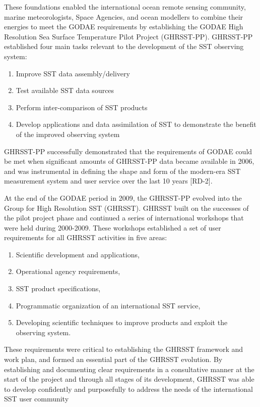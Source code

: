 These foundations enabled the international ocean remote sensing community, marine
meteorologists, Space Agencies, and ocean modellers to combine their energies to meet the GODAE
requirements by establishing the GODAE High Resolution Sea Surface Temperature Pilot Project
(GHRSST-PP). GHRSST-PP established four main tasks relevant to the development of the SST
observing system:
\par\vspace{0.25cm}
\begin{enumerate}
    \item{Improve SST data assembly/delivery}
    \item{Test available SST data sources }
    \item{Perform inter-comparison of SST products }
    \item{Develop applications and data assimilation of SST to demonstrate the benefit of the improved observing system}
\end{enumerate}
\par\vspace{0.25cm}
GHRSST-PP successfully demonstrated that the requirements of GODAE could be met when significant amounts of GHRSST-PP data became available in 2006, and was instrumental in defining the shape and form of the modern-era SST measurement system and user service over the last 10 years [RD-2].
\par\vspace{0.25cm}
At the end of the GODAE period in 2009, the GHRSST-PP evolved into the Group for High Resolution SST (GHRSST). GHRSST built on the successes of the pilot project phase and continued a series of international workshops that were held during 2000-2009. These workshops established a set of user requirements for all GHRSST activities in five areas:
\par\vspace{0.25cm}
\begin{enumerate}
    \item{Scientific development and applications,}
    \item{Operational agency requirements,}
    \item{SST product specifications,}
    \item{Programmatic organization of an international SST service,}
    \item{Developing scientific techniques to improve products and exploit the observing system.}
\end{enumerate}
\par\vspace{0.25cm}
These requirements were critical to establishing the GHRSST framework and work plan, and formed an essential part of the GHRSST evolution. By establishing and documenting clear requirements in a consultative manner at the start of the project and through all stages of its development, GHRSST was able to develop confidently and purposefully to address the needs of the international SST user community
\par\vspace{0.5cm}
